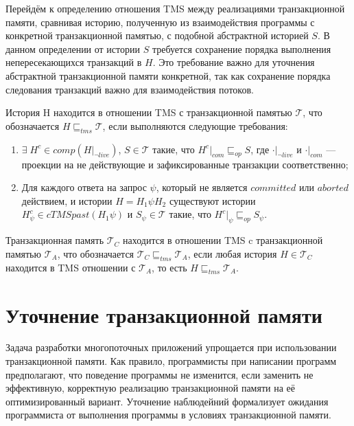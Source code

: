 Перейдём к определению отношения TMS между реализациями транзакционной памяти, сравнивая историю, полученную из взаимодействия программы с конкретной транзакционной памятью, с подобной абстрактной историей $S$. В данном определении от истории $S$ требуется сохранение порядка выполнения непересекающихся транзакций в $H$. Это требование важно для уточнения абстрактной транзакционной памяти конкретной, так как сохранение порядка следования транзакций важно для взаимодействия потоков.
\begin{mydefinition}\label{tms}
История H находится в отношении TMS с транзакционной памятью $\mathcal{T}$, что обозначается $H \sqsubseteq_{tms} \mathcal{T}$, если выполняются следующие требования:
\begin{enumerate}[label = (\roman*)]
\item $\exists \; H^c \in comp(H|_{\neg live})$, $S \in \mathcal{T}$ такие, что $H^c|_{com} \sqsubseteq_{op} S$, где $\cdot|_{\neg live}$ и $\cdot|_{com}$ --- проекции на не действующие и зафиксированные транзакции соответственно;
\item Для каждого ответа на запрос $\psi$, который не является $committed$ или $aborted$ действием, и истории $H = H_1\psi{H_2}$ существуют истории $H^c_{\psi} \in cTMSpast(H_1\psi)$ и $S_{\psi} \in \mathcal{T}$ такие, что $H^c|_{\psi} \sqsubseteq_{op} S_{\psi}$. 
\end{enumerate}
Транзакционная память $\mathcal{T}_C$ находится в отношении TMS c транзакционной памятью $\mathcal{T}_A$, что обозначается $\mathcal{T}_C \sqsubseteq_{tms} \mathcal{T}_A$, если любая история $H \in \mathcal{T}_C$ находится в TMS отношении с $\mathcal{T}_A$, то есть $H \sqsubseteq_{tms} \mathcal{T}_{A}$.
\end{mydefinition}

\section{Уточнение транзакционной памяти}
Задача разработки многопоточных приложений упрощается при использовании транзакционной памяти. Как правило, программисты при написании программ предполагают, что поведение программы не изменится, если заменить не эффективную, корректную реализацию транзакционной памяти на её оптимизированный вариант. Уточнение наблюдейний формализует ожидания программиста от выполнения программы в условиях транзакционной памяти.

